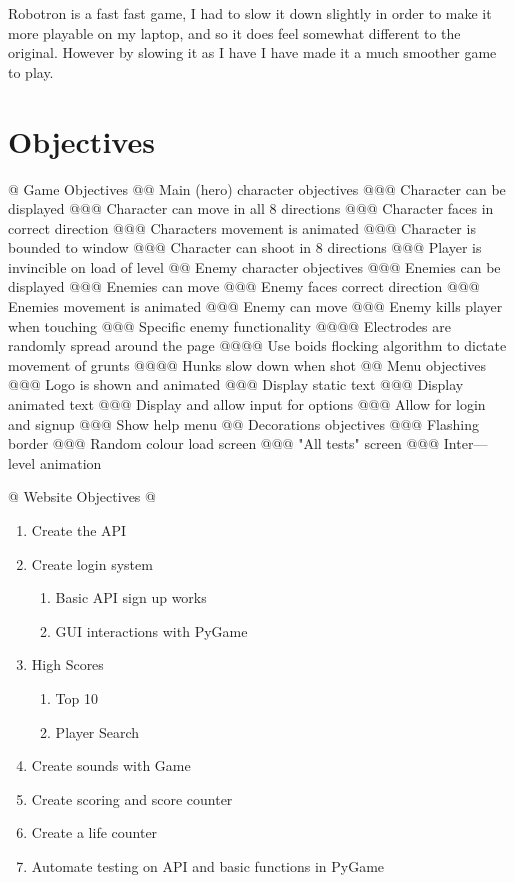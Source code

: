 \documentclass[a4paper, 11pt]{report}
\begin{document}
Robotron is a fast fast game, I had to slow it down slightly in order to make it more playable on my laptop, and so it does feel somewhat different to the original. However by slowing it as I have I have made it a much smoother game to play.

\section{Objectives}
\begin{easylist}[articletoc]
@ Game Objectives
@@ Main (hero) character objectives
@@@ Character can be displayed
@@@ Character can move in all 8 directions
@@@ Character faces in correct direction
@@@ Characters movement is animated
@@@ Character is bounded to window
@@@ Character can shoot in 8 directions
@@@ Player is invincible on load of level
@@ Enemy character objectives
@@@ Enemies can be displayed
@@@ Enemies can move
@@@ Enemy faces correct direction
@@@ Enemies movement is animated
@@@ Enemy can move
@@@ Enemy kills player when touching
@@@ Specific enemy functionality
@@@@ Electrodes are randomly spread around the page
@@@@ Use boids flocking algorithm to dictate movement of grunts
@@@@ Hunks slow down when shot
@@ Menu objectives
@@@ Logo is shown and animated
@@@ Display static text
@@@ Display animated text
@@@ Display and allow input for options
@@@ Allow for login and signup
@@@ Show help menu
@@ Decorations objectives
@@@ Flashing border
@@@ Random colour load screen
@@@ "All tests" screen
@@@ Inter---level animation

@ Website Objectives
@
\end{easylist}

\begin{enumerate}

    \item Create the API
    \item Create login system
        \begin{enumerate}
            \item Basic API sign up works
            \item GUI interactions with PyGame
        \end{enumerate}
    \item High Scores
        \begin{enumerate}
            \item Top 10
            \item Player Search
        \end{enumerate}
    \item Create sounds with Game
    \item Create scoring and score counter
    \item Create a life counter
    \item Automate testing on API and basic functions in PyGame
\end{enumerate}
\end{document}

